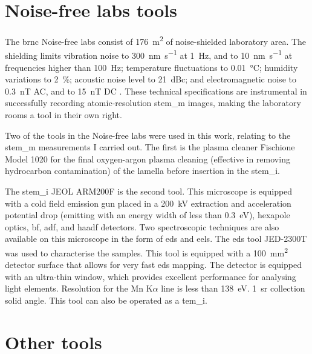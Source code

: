 \section{Noise-free labs tools}

The \acs{brnc} Noise-free labs consist of \qty{176}{\m^2} of noise-shielded laboratory area. The shielding limits vibration noise to \qty{300}{\nm\per\s} at \qty{1}{Hz}, and to \qty{10}{\nm\per\s} at frequencies higher than \qty{100}{Hz}; temperature fluctuations to \qty{0.01}{\degreeCelsius}; humidity variations to \qty{2}{\%}; acoustic noise level to \qty{21}{dBc}; and electromagnetic noise to \qty{0.3}{\nano\tesla} AC, and to \qty{15}{\nano\tesla} DC \cite{Lörtscher_Noise_Free}. These technical specifications are instrumental in successfully recording atomic-resolution \acf{stem_m} images, making the laboratory rooms a tool in their own right.
\par
Two of the tools in the Noise-free labs were used in this work, relating to the \acs{stem_m} measurements I carried out. The first is the plasma cleaner Fischione Model 1020 for the final oxygen-argon plasma cleaning (effective in removing hydrocarbon contamination) of the lamella before insertion in the \acs{stem_i}. 
\par 
The \acl{stem_i} JEOL ARM200F is the second tool. This microscope is equipped with a cold field emission gun placed in a \qty{200}{\kV} extraction and acceleration potential drop (emitting with an energy width of less than \qty{0,3}{eV}), hexapole optics, \acf{bf}, \acf{adf}, and \acf{haadf} detectors. Two spectroscopic techniques are also available on this microscope in the form of \acf{eds} and \acf{eels}. The \acs{eds} tool JED-2300T was used to characterise the samples. This tool is equipped with a \qty{100}{\mm^2} detector surface that allows for very fast \acs{eds} mapping. The detector is equipped with an ultra-thin window, which provides excellent performance for analysing light elements. Resolution for the Mn K$\alpha$ line is less than \qty{138}{\eV}. \qty{1}{\steradian} collection solid angle. This tool can also be operated as a \acf{tem_i}.

\section{Other tools}


